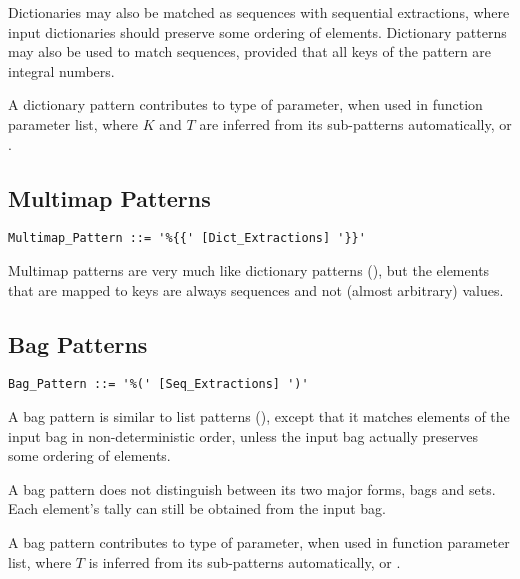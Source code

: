 Dictionaries may also be matched as sequences with sequential extractions, where input dictionaries should preserve some ordering of elements. Dictionary patterns may also be used to match sequences, provided that all keys of the pattern are integral numbers. 

A dictionary pattern contributes  to type of parameter, when used in function parameter list, where $K$ and $T$ are inferred from its sub-patterns automatically, or . 





\subsection{Multimap Patterns}
\label{sec:multimap-patterns}

\syntax\begin{lstlisting}
Multimap_Pattern ::= '%{{' [Dict_Extractions] '}}'
\end{lstlisting}

Multimap patterns are very much like dictionary patterns (), but the elements that are mapped to keys are always sequences and not (almost arbitrary) values. 





\subsection{Bag Patterns}
\label{sec:bag-patterns}

\syntax\begin{lstlisting}
Bag_Pattern ::= '%(' [Seq_Extractions] ')'
\end{lstlisting}

A bag pattern is similar to list patterns (), except that it matches elements of the input bag in non-deterministic order, unless the input bag actually preserves some ordering of elements. 

A bag pattern does not distinguish between its two major forms, bags and sets. Each element's tally can still be obtained from the input bag. 

A bag pattern contributes  to type of parameter, when used in function parameter list, where $T$ is inferred from its sub-patterns automatically, or . 





